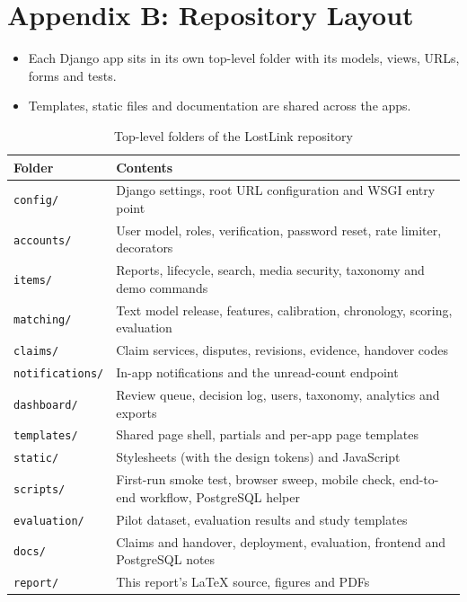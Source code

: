 \documentclass[12pt,a4paper,oneside]{report}
\renewcommand{\arraystretch}{1.18}
\newcommand{\code}[1]{\texttt{#1}}
\begin{document}
\chapter*{Appendix B: Repository Layout}
\begin{itemize}
  \item Each Django app sits in its own top-level folder with its models, views, URLs, forms and tests.
  \item Templates, static files and documentation are shared across the apps.
\end{itemize}
\begin{table}[H]
\centering\footnotesize\renewcommand{\arraystretch}{1.0}
\caption{Top-level folders of the LostLink repository}
\begin{tabularx}{\textwidth}{P{34mm}X}
\toprule
Folder & Contents\\
\midrule
\code{config/} & Django settings, root URL configuration and WSGI entry point\\
\code{accounts/} & User model, roles, verification, password reset, rate limiter, decorators\\
\code{items/} & Reports, lifecycle, search, media security, taxonomy and demo commands\\
\code{matching/} & Text model release, features, calibration, chronology, scoring, evaluation\\
\code{claims/} & Claim services, disputes, revisions, evidence, handover codes\\
\code{notifications/} & In-app notifications and the unread-count endpoint\\
\code{dashboard/} & Review queue, decision log, users, taxonomy, analytics and exports\\
\code{templates/} & Shared page shell, partials and per-app page templates\\
\code{static/} & Stylesheets (with the design tokens) and JavaScript\\
\code{scripts/} & First-run smoke test, browser sweep, mobile check, end-to-end workflow, PostgreSQL helper\\
\code{evaluation/} & Pilot dataset, evaluation results and study templates\\
\code{docs/} & Claims and handover, deployment, evaluation, frontend and PostgreSQL notes\\
\code{report/} & This report's LaTeX source, figures and PDFs\\
\bottomrule
\end{tabularx}
\end{table}
\end{document}
